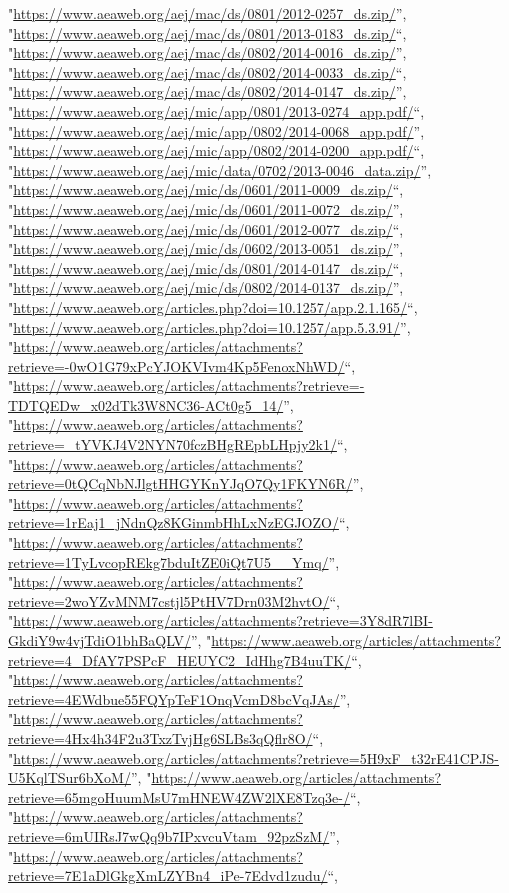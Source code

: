 \documentclass[]{article}
\begin{document}
\begin{itemize}
  "\url{https://www.aeaweb.org/aej/mac/ds/0801/2012-0257_ds.zip/}'',
  "\url{https://www.aeaweb.org/aej/mac/ds/0801/2013-0183_ds.zip/}``,
  "\url{https://www.aeaweb.org/aej/mac/ds/0802/2014-0016_ds.zip/}'',
  "\url{https://www.aeaweb.org/aej/mac/ds/0802/2014-0033_ds.zip/}``,
  "\url{https://www.aeaweb.org/aej/mac/ds/0802/2014-0147_ds.zip/}'',
  "\url{https://www.aeaweb.org/aej/mic/app/0801/2013-0274_app.pdf/}``,
  "\url{https://www.aeaweb.org/aej/mic/app/0802/2014-0068_app.pdf/}'',
  "\url{https://www.aeaweb.org/aej/mic/app/0802/2014-0200_app.pdf/}``,
  "\url{https://www.aeaweb.org/aej/mic/data/0702/2013-0046_data.zip/}'',
  "\url{https://www.aeaweb.org/aej/mic/ds/0601/2011-0009_ds.zip/}``,
  "\url{https://www.aeaweb.org/aej/mic/ds/0601/2011-0072_ds.zip/}'',
  "\url{https://www.aeaweb.org/aej/mic/ds/0601/2012-0077_ds.zip/}``,
  "\url{https://www.aeaweb.org/aej/mic/ds/0602/2013-0051_ds.zip/}'',
  "\url{https://www.aeaweb.org/aej/mic/ds/0801/2014-0147_ds.zip/}``,
  "\url{https://www.aeaweb.org/aej/mic/ds/0802/2014-0137_ds.zip/}'',
  "\url{https://www.aeaweb.org/articles.php?doi=10.1257/app.2.1.165/}``,
  "\url{https://www.aeaweb.org/articles.php?doi=10.1257/app.5.3.91/}'',
  "\url{https://www.aeaweb.org/articles/attachments?retrieve=-0wO1G79xPcYJOKVIvm4Kp5FenoxNhWD/}``,
  "\url{https://www.aeaweb.org/articles/attachments?retrieve=-TDTQEDw_x02dTk3W8NC36-ACt0g5_14/}'',
  "\url{https://www.aeaweb.org/articles/attachments?retrieve=_tYVKJ4V2NYN70fczBHgREpbLHpjy2k1/}``,
  "\url{https://www.aeaweb.org/articles/attachments?retrieve=0tQCqNbNJlgtHHGYKnYJqO7Qy1FKYN6R/}'',
  "\url{https://www.aeaweb.org/articles/attachments?retrieve=1rEaj1_jNdnQz8KGinmbHhLxNzEGJOZO/}``,
  "\url{https://www.aeaweb.org/articles/attachments?retrieve=1TyLvcopREkg7bduItZE0iQt7U5__Ymq/}'',
  "\url{https://www.aeaweb.org/articles/attachments?retrieve=2woYZvMNM7cstjl5PtHV7Drn03M2hvtO/}``,
  "\url{https://www.aeaweb.org/articles/attachments?retrieve=3Y8dR7lBI-GkdiY9w4vjTdiO1bhBaQLV/}'',
  "\url{https://www.aeaweb.org/articles/attachments?retrieve=4_DfAY7PSPcF_HEUYC2_IdHhg7B4uuTK/}``,
  "\url{https://www.aeaweb.org/articles/attachments?retrieve=4EWdbue55FQYpTeF1OnqVcmD8bcVqJAs/}'',
  "\url{https://www.aeaweb.org/articles/attachments?retrieve=4Hx4h34F2u3TxzTvjHg6SLBs3qQflr8O/}``,
  "\url{https://www.aeaweb.org/articles/attachments?retrieve=5H9xF_t32rE41CPJS-U5KqlTSur6bXoM/}'',
  "\url{https://www.aeaweb.org/articles/attachments?retrieve=65mgoHuumMsU7mHNEW4ZW2lXE8Tzq3e-/}``,
  "\url{https://www.aeaweb.org/articles/attachments?retrieve=6mUIRsJ7wQq9b7IPxvcuVtam_92pzSzM/}'',
  "\url{https://www.aeaweb.org/articles/attachments?retrieve=7E1aDlGkgXmLZYBn4_iPe-7Edvd1zudu/}``,

\end{itemize}
\end{document}
